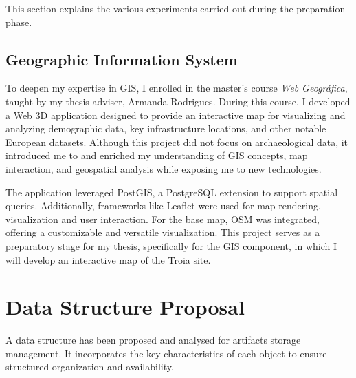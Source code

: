 This section explains the various experiments carried out during the preparation phase.

\subsection{Geographic Information System}
\label{sec:gis_previous} 

To deepen my expertise in \gls{GIS}, I enrolled in the master's course \textit{Web Geográfica}, taught by my thesis adviser, Armanda Rodrigues. During this course, I developed a Web \gls{3D} application designed to provide an interactive map for visualizing and analyzing demographic data, key infrastructure locations, and other notable European datasets. Although this project did not focus on archaeological data, it introduced me to and enriched my understanding of GIS concepts, map interaction, and geospatial analysis while exposing me to new technologies.


The application leveraged PostGIS, a PostgreSQL extension to support spatial queries.
Additionally, frameworks like Leaflet were used for map rendering, visualization and user interaction. For the base map, \gls{OSM} was integrated, offering a customizable and versatile visualization. This project serves as a preparatory stage for my thesis, specifically for the \gls{GIS} component, in which I will develop an interactive map of the Troia site.

\section{Data Structure Proposal}
\label{sec:data_strucutre}

A data structure has been proposed and analysed for artifacts storage management.  
It incorporates the key characteristics of each object to ensure structured organization and availability.


